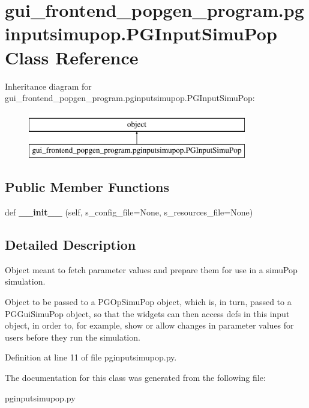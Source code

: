 \hypertarget{classgui__frontend__popgen__program_1_1pginputsimupop_1_1PGInputSimuPop}{}\section{gui\+\_\+frontend\+\_\+popgen\+\_\+program.\+pginputsimupop.\+P\+G\+Input\+Simu\+Pop Class Reference}
\label{classgui__frontend__popgen__program_1_1pginputsimupop_1_1PGInputSimuPop}
Inheritance diagram for gui\+\_\+frontend\+\_\+popgen\+\_\+program.\+pginputsimupop.\+P\+G\+Input\+Simu\+Pop\+:\begin{figure}[H]
\begin{center}
\leavevmode
\includegraphics[height=2.000000cm]{classgui__frontend__popgen__program_1_1pginputsimupop_1_1PGInputSimuPop}
\end{center}
\end{figure}
\subsection*{Public Member Functions}
\begin{DoxyCompactItemize}
\item 
def {\bfseries \+\_\+\+\_\+init\+\_\+\+\_\+} (self, s\+\_\+config\+\_\+file=None, s\+\_\+resources\+\_\+file=None)\hypertarget{classgui__frontend__popgen__program_1_1pginputsimupop_1_1PGInputSimuPop_a64b16863b0a6048d9451ec8b64e3a79f}{}\label{classgui__frontend__popgen__program_1_1pginputsimupop_1_1PGInputSimuPop_a64b16863b0a6048d9451ec8b64e3a79f}

\end{DoxyCompactItemize}


\subsection{Detailed Description}
\begin{DoxyVerb}Object meant to fetch parameter values and prepare them for 
use in a simuPop simulation.  

Object to be passed to a PGOpSimuPop object, which is, in turn,
passed to a PGGuiSimuPop object, so that the widgets can then access
defs in this input object, in order to, for example, show or allow
changes in parameter values for users before they run the simulation.
\end{DoxyVerb}
 

Definition at line 11 of file pginputsimupop.\+py.



The documentation for this class was generated from the following file\+:\begin{DoxyCompactItemize}
\item 
pginputsimupop.\+py\end{DoxyCompactItemize}

